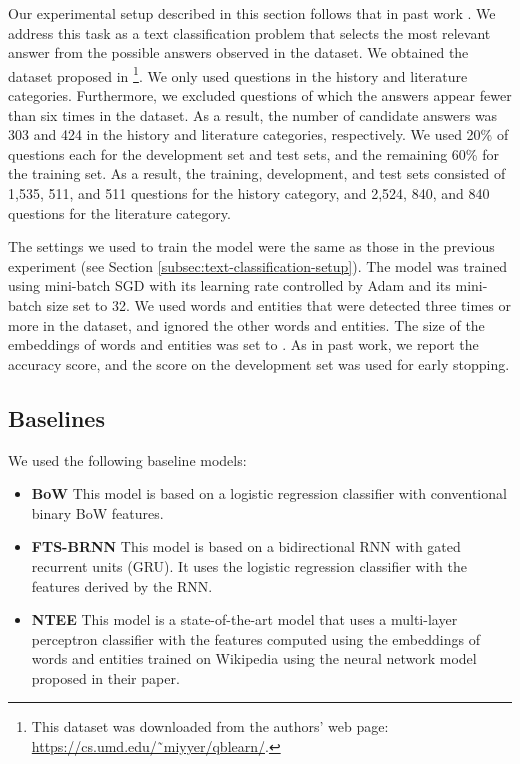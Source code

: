 \documentclass[11pt,a4paper]{article}
\begin{document}
    Our experimental setup described in this section follows that in past work \cite{Xu2016,TACL1065}.
    We address this task as a text classification problem that selects the most relevant answer from the possible answers observed in the dataset.
    We obtained the dataset proposed in \footnote{This dataset was downloaded from the authors' web page: \url{https://cs.umd.edu/˜miyyer/qblearn/}.}.
    We only used questions in the history and literature categories.
    Furthermore, we excluded questions of which the answers appear fewer than six times in the dataset.
    As a result, the number of candidate answers was 303 and 424 in the history and literature categories, respectively.
    We used 20\% of questions each for the development set and test sets, and the remaining 60\% for the training set.
    As a result, the training, development, and test sets consisted of 1,535, 511, and 511 questions for the history category, and 2,524, 840, and 840 questions for the literature category.

    The settings we used to train the model were the same as those in the previous experiment (see Section \ref{subsec:text-classification-setup}).
    The model was trained using mini-batch SGD with its learning rate controlled by Adam \cite{kingma2014adam} and its mini-batch size set to 32.
    We used words and entities that were detected three times or more in the dataset, and ignored the other words and entities.
    The size of the embeddings of words and entities was set to .
    As in past work, we report the accuracy score, and the score on the development set was used for early stopping.

    \subsection{Baselines}
    We used the following baseline models:

    \begin{itemize}
        \item \textbf{BoW} \cite{Xu2016} This model is based on a logistic regression classifier with conventional binary BoW features.
        \item \textbf{FTS-BRNN} \cite{Xu2016} This model is based on a bidirectional RNN with gated recurrent units (GRU). It uses the logistic regression classifier with the features derived by the RNN.
        \item \textbf{NTEE} \cite{TACL1065} This model is a state-of-the-art model that uses a multi-layer perceptron classifier with the features computed using the embeddings of words and entities trained on Wikipedia using the neural network model proposed in their paper.
    \end{itemize}
\end{document}

